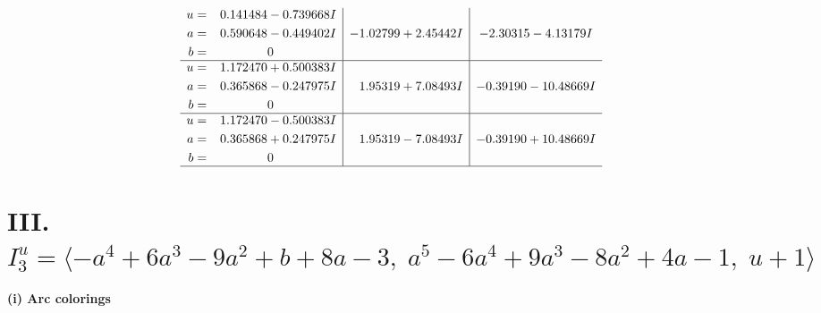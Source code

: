 \documentclass[1p]{elsarticle_modified}
\theoremstyle{definition}
\begin{document}
$$\begin{array}{c|c|c}
\begin{aligned}
u &= \phantom{-}0.141484 - 0.739668 I \\
a &= \phantom{-}0.590648 - 0.449402 I \\
b &= \phantom{-0.000000 } 0\end{aligned}
 & -1.02799 + 2.45442 I & -2.30315 - 4.13179 I \\ \hline\begin{aligned}
u &= \phantom{-}1.172470 + 0.500383 I \\
a &= \phantom{-}0.365868 - 0.247975 I \\
b &= \phantom{-0.000000 } 0\end{aligned}
 & \phantom{-}1.95319 + 7.08493 I & -0.39190 - 10.48669 I \\ \hline\begin{aligned}
u &= \phantom{-}1.172470 - 0.500383 I \\
a &= \phantom{-}0.365868 + 0.247975 I \\
b &= \phantom{-0.000000 } 0\end{aligned}
 & \phantom{-}1.95319 - 7.08493 I & -0.39190 + 10.48669 I\\
 \hline 
 \end{array}$$\newpage\newpage\renewcommand{\arraystretch}{1}
\centering \section*{III. $I^u_{3}= \langle - a^4+6 a^3-9 a^2+b+8 a-3,\;a^5-6 a^4+9 a^3-8 a^2+4 a-1,\;u+1 \rangle$}
\flushleft \textbf{(i) Arc colorings}\\
\end{document}
